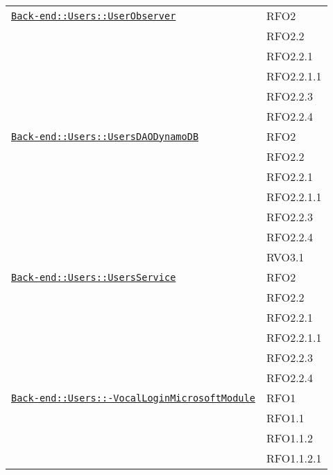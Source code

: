 \begin{longtable}{|>{\centering}m{10cm}|m{3cm}<{\centering}|}
\hyperref[Back-end::Users::UserObserver]{\texttt{Back-end::Users::UserObserver}} & RFO2\\
& RFO2.2\\
& RFO2.2.1\\
& RFO2.2.1.1\\
& RFO2.2.3\\
& RFO2.2.4\\ \hline

\hyperref[Back-end::Users::UsersDAODynamoDB]{\texttt{Back-end::Users::UsersDAODynamoDB}} & RFO2\\
& RFO2.2\\
& RFO2.2.1\\
& RFO2.2.1.1\\
& RFO2.2.3\\
& RFO2.2.4\\
& RVO3.1\\ \hline

\hyperref[Back-end::Users::UsersService]{\texttt{Back-end::Users::UsersService}} & RFO2\\
& RFO2.2\\
& RFO2.2.1\\
& RFO2.2.1.1\\
& RFO2.2.3\\
& RFO2.2.4\\ \hline

\hyperref[Back-end::Users::VocalLoginMicrosoftModule]{\texttt{Back-end::Users::-\linebreak VocalLoginMicrosoftModule}} & RFO1\\
& RFO1.1\\
& RFO1.1.2\\
& RFO1.1.2.1\\ \hline


\end{longtable}
